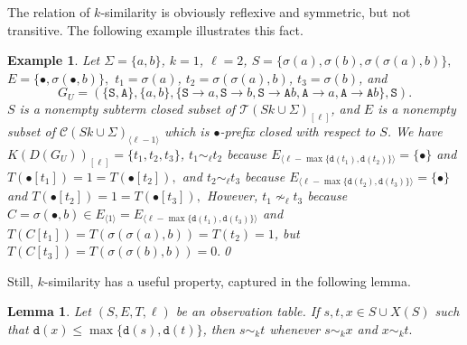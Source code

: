 \documentclass[preprint,12pt,english]{article}
\def\hole{\bullet}
\def\tS{\mathtt{S}}
\def\tA{\mathtt{A}}
\def\cC{\mathcal{C}}
\def\cT{\mathcal{T}}
\def\depth{\mathtt{d}}
\newcommand\pair[1]{\langle{#1}\rangle}
\newtheorem{example}{Example}
\newtheorem{lemma}{Lemma}
\begin{document}
The relation of $k$-similarity is obviously reflexive and symmetric, but  not transitive. The following example illustrates this fact.
\begin{example}
Let $\Sigma=\{a,b\}$, $k=1$, $\ell=2$, $S=\{\sigma(a),\sigma(b),\sigma(\sigma(a),b)\},$ $ E=\{\hole,\sigma(\hole,b)\},$ $ t_1=\sigma(a)$, $t_2=\sigma(\sigma(a),b)$, $t_3=\sigma(b)$, and
$$G_U=(\{\tS,\tA\},\{a,b\},\{\tS\to a,\tS\to b,\tS\to \tA b, \tA\to a,\tA\to \tA b\},\tS).$$ $S$ is a nonempty subterm closed subset of $\cT(Sk\cup\Sigma)_{[\ell]}$, and $E$ is a nonempty subset of $\cC(Sk\cup\Sigma)_{\pair{\ell-1}}$ which is $\bullet$-prefix closed with respect to $S$. We have $K(D(G_U))_{[\ell]}=\{t_1,t_2,t_3\}$, 
$t_1\sim_\ell t_2$ because $E_{\pair{\ell-\max\{\depth(t_1),\depth(t_2)\}}}=\{\hole\}$ and $T(\hole[t_1])=1=T(\hole[t_2]),$ and
$t_2\sim_\ell t_3$ because  $E_{\pair{\ell-\max\{\depth(t_2),\depth(t_3)\}}}=\{\hole\}$ and $T(\hole[t_2])=1=T(\hole[t_3]),$
However, $t_1\nsim_\ell t_3$ because $C=\sigma(\hole,b)\in E_{\pair{1}}=E_{\pair{\ell-\max\{\depth(t_1),\depth(t_3)\}}}$ and $T(C[t_1])=T(\sigma(\sigma(a),b))=T(t_2)=1$, but $T(C[t_3])=T(\sigma(\sigma(b),b))=0.$\qed
\end{example}
Still, $k$-similarity has a useful property, captured in the following lemma.
\begin{lemma}
\label{lema1}
Let $(S,E,T,\ell)$ be an observation table. If $s,t,x\in S\cup X(S)$ such that $\depth(x)\leq\max\{\depth(s),\depth(t)\}$, then $s\sim_k t$ whenever $s\sim_k x$ and $x\sim_k t.$
\end{lemma}
\end{document}
